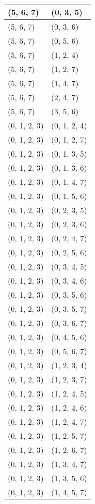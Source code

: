 \begin{footnotesize}
\begin{longtable}[c]{|l|l|}
(5, 6, 7)
&(0, 3, 5)
\\ \hline
(5, 6, 7)
&(0, 3, 6)
\\ \hline
(5, 6, 7)
&(0, 5, 6)
\\ \hline
(5, 6, 7)
&(1, 2, 4)
\\ \hline
(5, 6, 7)
&(1, 2, 7)
\\ \hline
(5, 6, 7)
&(1, 4, 7)
\\ \hline
(5, 6, 7)
&(2, 4, 7)
\\ \hline
(5, 6, 7)
&(3, 5, 6)
\\ \hline
(0, 1, 2, 3)
&(0, 1, 2, 4)
\\ \hline
(0, 1, 2, 3)
&(0, 1, 2, 7)
\\ \hline
(0, 1, 2, 3)
&(0, 1, 3, 5)
\\ \hline
(0, 1, 2, 3)
&(0, 1, 3, 6)
\\ \hline
(0, 1, 2, 3)
&(0, 1, 4, 7)
\\ \hline
(0, 1, 2, 3)
&(0, 1, 5, 6)
\\ \hline
(0, 1, 2, 3)
&(0, 2, 3, 5)
\\ \hline
(0, 1, 2, 3)
&(0, 2, 3, 6)
\\ \hline
(0, 1, 2, 3)
&(0, 2, 4, 7)
\\ \hline
(0, 1, 2, 3)
&(0, 2, 5, 6)
\\ \hline
(0, 1, 2, 3)
&(0, 3, 4, 5)
\\ \hline
(0, 1, 2, 3)
&(0, 3, 4, 6)
\\ \hline
(0, 1, 2, 3)
&(0, 3, 5, 6)
\\ \hline
(0, 1, 2, 3)
&(0, 3, 5, 7)
\\ \hline
(0, 1, 2, 3)
&(0, 3, 6, 7)
\\ \hline
(0, 1, 2, 3)
&(0, 4, 5, 6)
\\ \hline
(0, 1, 2, 3)
&(0, 5, 6, 7)
\\ \hline
(0, 1, 2, 3)
&(1, 2, 3, 4)
\\ \hline
(0, 1, 2, 3)
&(1, 2, 3, 7)
\\ \hline
(0, 1, 2, 3)
&(1, 2, 4, 5)
\\ \hline
(0, 1, 2, 3)
&(1, 2, 4, 6)
\\ \hline
(0, 1, 2, 3)
&(1, 2, 4, 7)
\\ \hline
(0, 1, 2, 3)
&(1, 2, 5, 7)
\\ \hline
(0, 1, 2, 3)
&(1, 2, 6, 7)
\\ \hline
(0, 1, 2, 3)
&(1, 3, 4, 7)
\\ \hline
(0, 1, 2, 3)
&(1, 3, 5, 6)
\\ \hline
(0, 1, 2, 3)
&(1, 4, 5, 7)
\\ \hline

\end{longtable}
\end{footnotesize}
